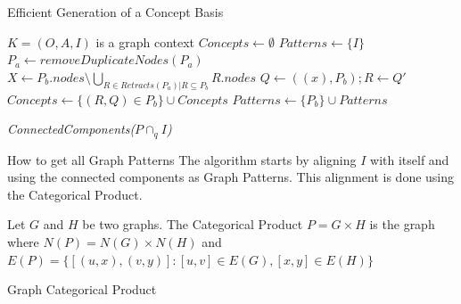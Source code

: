 \documentclass[pdf,xcolor=table]{beamer}
\begin{document}
\begin{frame}[t,label=graph_alg]{Efficient Generation of a Concept Basis}
    \begin{algorithm}[H]
        \tiny
        \begin{algorithmic}[1]
            \REQUIRE $K = (O, A, I)$ is a graph context
            \STATE $Concepts \leftarrow \emptyset$
            \STATE $Patterns \leftarrow \{I\}$
                    \STATE $P_a \leftarrow removeDuplicateNodes(P_a)$
                        \STATE $X \leftarrow P_b.nodes \setminus \bigcup_{R \in Retracts(P_a) | R \subseteq P_b} R.nodes$
                                \STATE $Q \leftarrow ((x), P_b); R \leftarrow Q'$
                                \STATE $Concepts \leftarrow \{(R, Q) \in P_b\} \cup Concepts$
                            \ENDFOR
                            \STATE $Patterns \leftarrow \{P_b\} \cup Patterns$
                        \ENDIF
                    \ENDFOR
                \ENDFOR
            \ENDFOR
        \end{algorithmic}
        \caption{Generation of concepts(($A, B$), $y$)}
        \label{alg:gofconcepts}
    \end{algorithm}
\end{frame}

\begin{frame}[t]{\textit{ConnectedComponents($P \cap_q I$)}}
    \begin{block}{How to get all Graph Patterns}
        The algorithm starts by aligning $I$ with itself and using the connected components as Graph Patterns. This alignment is done using the Categorical Product.
    \end{block}
    \begin{definition}
        Let $G$ and $H$ be two graphs.
        The Categorical Product $P = G \times H$ is the graph where $N(P) = N(G) \times N(H)$ and $E(P) = \{[(u, x),(v, y)] : [u, v] \in E(G), [x, y] \in E(H)\}$
    \end{definition}
\end{frame}

\begin{frame}[t]{Graph Categorical Product}
    \cite{Brewster}
\end{frame}


\end{document}

